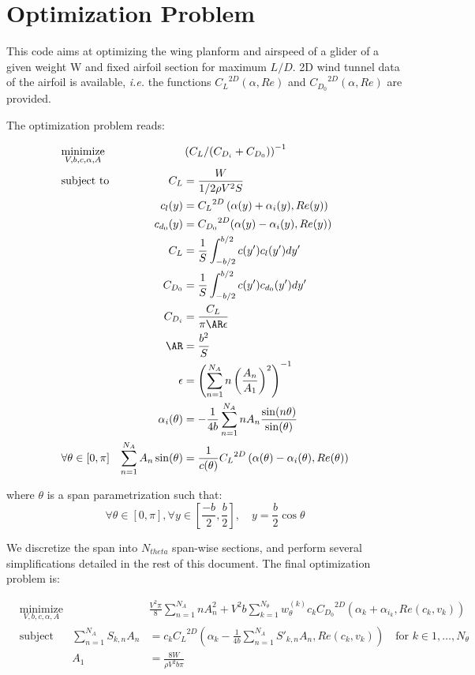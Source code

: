 \documentclass[letterpaper,12pt]{article}
\begin{document}
\section{Optimization Problem}

This code aims at optimizing the wing planform and airspeed of a glider of a given weight W and fixed airfoil section for maximum $L/D$.
2D wind tunnel data of the airfoil is available, {\it i.e.} the functions
${C_L}^{2D}(\alpha, Re)$ and 
${C_{D_0}}^{2D}(\alpha, Re)$ are provided.

The optimization problem reads:

\begin{align*}
	& \underset{V, b, c, \alpha, A}{\text{minimize}}
	& & \left( C_L / (C_{D_i} + C_{D_0})\right)^{-1} \nonumber \\
	& \text{subject to} 
	& C_L &= \frac{W}{1/2 \rho V^2 S} \\
	& & c_l(y) &= {C_L}^{2D} \left( \alpha(y) + \alpha_i(y), Re(y)\right) \\
	& & c_{d_0}(y) &= {C_{D_0}}^{2D}(\alpha(y) - \alpha_i(y), Re(y)) \\
	& & C_L &= \frac 1 S \int_{-b/2}^{b/2} c(y') c_l(y') dy'\\
	& & C_{D_0} &= \frac 1 S \int_{-b/2}^{b/2} c(y') c_{d_0}(y') dy'\\
	& & C_{D_i} & = \frac{C_L}{\pi \AR \epsilon} \\
	& & \AR &= \frac{b^2}{S} \\
	& & \epsilon &= \left(\sum_{n=1}^{N_A} n \left(\frac{A_n}{A_1}\right)^2 \right)^{-1} \\
	& & \alpha_i(\theta) &= -\frac 1 {4b} \sum_{n=1}^{N_A} n A_n\frac{\sin(n\theta)}{\sin(\theta)} \\
	& \forall \theta \in [0, \pi] & \sum_{n=1}^{N_A} A_n \sin(\theta) &= \frac{1}{
		c(\theta)} {C_L}^{2D} \left( 
			\alpha(\theta) - \alpha_i(\theta), Re(\theta)
		\right) \\
\end{align*}

where $\theta$ is a span parametrization such that:
$$\forall \theta \in [0,\pi], \forall y \in [\frac {-b} 2, \frac b 2], \quad y = \frac b 2 \cos\theta$$

We discretize the span into $N_{theta}$ span-wise sections, and perform several simplifications detailed in the rest of this document.
The final optimization problem is:

\begin{align*}
	& \underset{V, b, c, \alpha, A}{\text{minimize}}
	& & \frac{V^2 \pi}{8}\sum_{n=1}^{N_A} n A_{n}^2 +
	  V^2 b  \sum_{k=1}^{N_{\theta}} w_{\theta}^{(k)} c_k {C_{D_0}}^{2D}\left( 
		\alpha_k +\alpha_{i_k}, Re(c_k, v_k)
		\right) \\
	& \text{subject to}
	&  \sum_{n=1}^{N_{A}} S_{k,n} A_n &=  c_k{C_L}^{2D} \left( \alpha_k - \frac {1}{4b} 
		\sum_{n=1}^{N_{A}}S'_{k,n}A_n , Re(c_k, v_k)\right) \quad \text{for } k \in 1,\dots, N_{\theta} \\
	& &  A_1 &= \frac{8W}{\rho V^2 b \pi}\\
\end{align*}
\end{document}
